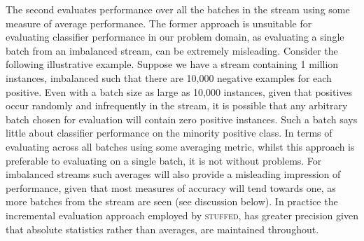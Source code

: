 \documentclass[twoside,a4paper]{refart}
\begin{document}
The second evaluates performance over all the batches in the stream using some measure of average performance. The former approach is unsuitable for evaluating classifier performance in our problem domain, as evaluating a single batch from an imbalanced stream, can be extremely misleading. Consider the following illustrative example. Suppose we have a stream containing 1 million instances, imbalanced such that there are 10,000 negative examples for each positive. Even with a batch size as large as 10,000 instances, given that positives occur randomly and infrequently in the stream, it is possible that any arbitrary batch chosen for evaluation will contain zero positive instances. Such a batch says little about classifier performance on the minority positive class. In terms of evaluating across all batches using some averaging metric, whilst this approach is preferable to evaluating on a single batch, it is not without problems. For imbalanced streams such averages will also provide a misleading impression of performance, given that most measures of accuracy will tend towards one, as more batches from the stream are seen (see discussion below). In practice the incremental evaluation approach employed by \textsc{stuffed}, has greater precision given that absolute statistics rather than averages, are maintained throughout.
\end{document}
